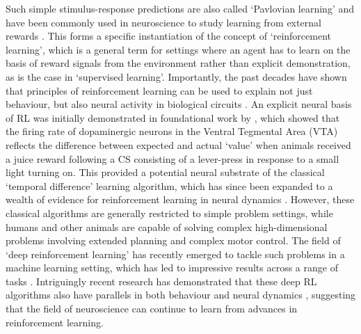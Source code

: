 Such simple stimulus-response predictions are also called `Pavlovian learning' and have been commonly used in neuroscience to study learning from external rewards \citep{niv2009reinforcement}.
This forms a specific instantiation of the concept of `reinforcement learning', which is a general term for settings where an agent has to learn on the basis of reward signals from the environment rather than explicit demonstration, as is the case in `supervised learning'.
Importantly, the past decades have shown that principles of reinforcement learning can be used to explain not just behaviour, but also neural activity in biological circuits \citep{niv2009reinforcement}.
An explicit neural basis of RL was initially demonstrated in foundational work by \citet{schultz1997neural}, which showed that the firing rate of dopaminergic neurons in the Ventral Tegmental Area (VTA) reflects the difference between expected and actual `value' when animals received a juice reward following a CS consisting of a lever-press in response to a small light turning on.
This provided a potential neural substrate of the classical `temporal difference' learning algorithm, which has since been expanded to a wealth of evidence for reinforcement learning in neural dynamics \citep{niv2009reinforcement, dabney2020distributional}.
However, these classical algorithms are generally restricted to simple problem settings, while humans and other animals are capable of solving complex high-dimensional problems involving extended planning and complex motor control.
The field of `deep reinforcement learning' has recently emerged to tackle such problems in a machine learning setting, which has led to impressive results across a range of tasks \citep{mnih2013playing, schrittwieser2020mastering, wurman2022outracing, vinyals2019grandmaster}.
Intriguingly recent research has demonstrated that these deep RL algorithms also have parallels in both behaviour and neural dynamics \citep{botvinick2020deep, wang2018prefrontal, dabney2020distributional, jensen2023recurrent}, suggesting that the field of neuroscience can continue to learn from advances in reinforcement learning.

